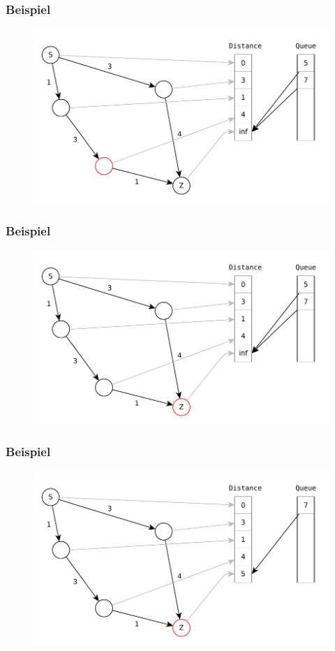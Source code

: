 \begin{frame}
\frametitle{Beispiel}
\begin{figure}
\includegraphics[scale=.8]{dijkstra_graphs/dijkstra_7.pdf}
\end{figure}
\end{frame}

\begin{frame}
\frametitle{Beispiel}
\begin{figure}
\includegraphics[scale=.8]{dijkstra_graphs/dijkstra_8.pdf}
\end{figure}
\end{frame}

\begin{frame}
\frametitle{Beispiel}
\begin{figure}
\includegraphics[scale=.8]{dijkstra_graphs/dijkstra_9.pdf}
\end{figure}
\end{frame}

